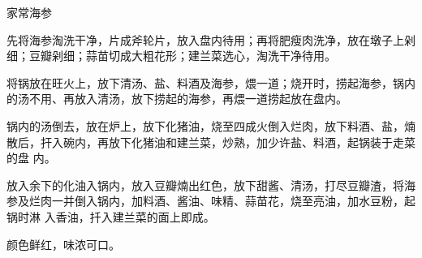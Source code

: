 \begin{recipe}{家常海参}

\ingredients


\preparation

\step 先将海参淘洗干净，片成斧轮片，放入盘内待用；再将肥瘦肉洗净，放在墩子上剁
细；豆瓣剁细；蒜苗切成大粗花形；建兰菜选心，淘洗干净待用。

\step 将锅放在旺火上，放下清汤、盐、料酒及海参，煨一道；烧开时，捞起海参，锅内
的汤不用、再放入清汤，放下捞起的海参，再煨一道捞起放在盘内。

\step 锅内的汤倒去，放在炉上，放下化猪油，烧至四成火倒入烂肉，放下料酒、盐，煵
散后，扞入碗内，再放下化猪油和建兰菜，炒熟，加少许盐、料酒，起锅装于走菜的盘
内。

\step 放入余下的化油入锅内，放入豆瓣煵出红色，放下甜酱、清汤，打尽豆瓣渣，将海
参及烂肉一并倒入锅内，加料酒、酱油、味精、蒜苗花，烧至亮油，加水豆粉，起锅时淋
入香油，扦入建兰菜的面上即成。

\features

颜色鲜红，味浓可口。

\end{recipe}

